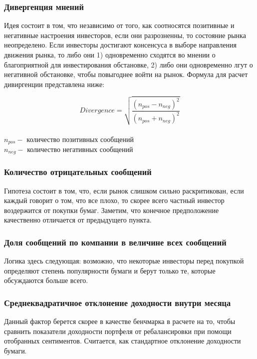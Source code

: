 \documentclass{article}
\begin{document}
\subsubsection{Дивергенция мнений}
Идея состоит в том, что независимо от того, как соотносятся позитивные и негативные настроения инвесторов, если они разрозненны, то состояние рынка неопределено. Если инвесторы достигают консенсуса в выборе направления движения рынка, то либо они 1) одновременно сходятся во мнении о благоприятной для инвестирования обстановке, 2) либо они одновременно лгут о негативной обстановке, чтобы повыгоднее войти на рынок. Формула для расчет дивиргенции представлена ниже:

\begin{equation*}
	Divergence = \sqrt{\frac{(n_{pos} - n_{neg})^2}{(n_{pos} + n_{neg})^2}}
\end{equation*}\\
$n_{pos} -$  количество позитивных сообщений \\
$n_{neg} -$  количество негативных сообщений

\subsubsection{Количество отрицательных сообщений}

Гипотеза состоит в том, что, если рынок слишком сильно раскритикован, если каждый говорит о том, что все плохо, то скорее всего частный инвестор воздержится от покупки бумаг. Заметим, что конечное предположение качественно отличается от предыдущего пункта.

\subsubsection{Доля сообщений по компании в величине всех сообщений}

Логика здесь следующая: возможно, что некоторые инвесторы перед покупкой определяют степень популярности бумаги и берут только те, которые обсуждаются больше всего.


\subsubsection{Среднеквадратичное отклонение доходности внутри месяца}

Данный фактор берется скорее в качестве бенчмарка в расчете на то, чтобы сравнить показатели доходности портфеля от ребалансировки при помощи отобранных сентиментов. Считается, как стандартное отклонение доходности бумаги.
\end{document}
